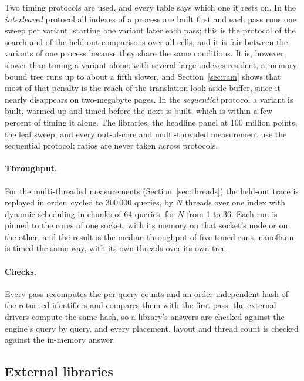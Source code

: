 Two timing protocols are used, and every table says which one it rests on. In the \emph{interleaved} protocol all indexes of a process are built first and each pass runs one sweep per variant, starting one variant later each pass; this is the protocol of the search and of the held-out comparisons over all \nCells{} cells, and it is fair between the variants of one process because they share the same conditions. It is, however, slower than timing a variant alone: with several large indexes resident, a memory-bound tree runs up to about a fifth slower, and Section~\ref{sec:ram} shows that most of that penalty is the reach of the translation look-aside buffer, since it nearly disappears on two-megabyte pages. In the \emph{sequential} protocol a variant is built, warmed up and timed before the next is built, which is within a few percent of timing it alone. The libraries, the headline panel at 100 million points, the leaf sweep, and every out-of-core and multi-threaded measurement use the sequential protocol; ratios are never taken across protocols.

\paragraph{Throughput.} For the multi-threaded measurements (Section~\ref{sec:threads}) the held-out trace is replayed in order, cycled to 300\,000 queries, by $N$ threads over one index with dynamic scheduling in chunks of 64 queries, for $N$ from 1 to 36. Each run is pinned to the cores of one socket, with its memory on that socket's node or on the other, and the result is the median throughput of five timed runs. nanoflann is timed the same way, with its own threads over its own tree.

\paragraph{Checks.} Every pass recomputes the per-query counts and an order-independent hash of the returned identifiers and compares them with the first pass; the external drivers compute the same hash, so a library's answers are checked against the engine's query by query, and every placement, layout and thread count is checked against the in-memory answer.

\subsection{External libraries}\label{sec:drivers}

